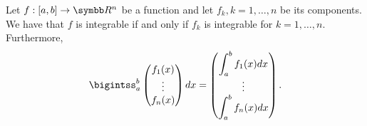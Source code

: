 \begin{proposition}\label{thm:componentwise_integration}
  Let \( f: [a, b] \to \BR^n \) be a function and let \( f_k, k = 1, \ldots, n \) be its components. We have that \( f \) is integrable if and only if \( f_k \) is integrable for \( k = 1, \ldots, n \). Furthermore,
  \begin{equation}\label{eq:thm:componentwise_integration}
    \bigintss_a^b \begin{pmatrix} f_1(x) \\ \vdots \\ f_n(x) \end{pmatrix} dx
    =
    \begin{pmatrix} {\displaystyle \int_a^b f_1(x)} dx \\ \vdots \\ {\displaystyle \int_a^b f_n(x) dx} \end{pmatrix}.
  \end{equation}
\end{proposition}
